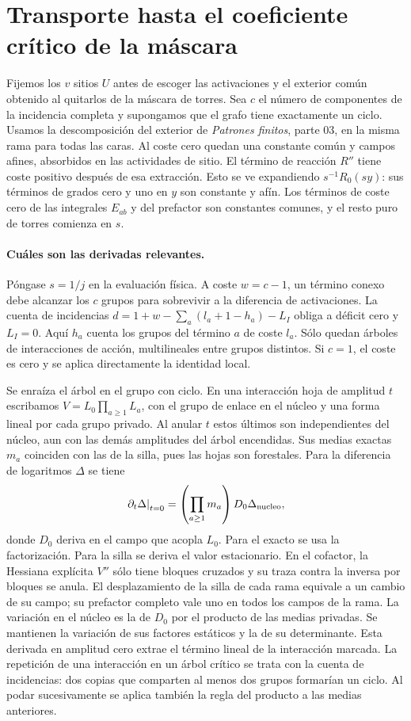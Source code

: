 \section{Transporte hasta el coeficiente crítico de la máscara}
Fijemos los $v$ sitios $U$ antes de escoger las activaciones y el exterior común
obtenido al quitarlos de la máscara de torres. Sea $c$ el número de componentes
de la incidencia completa y supongamos que el grafo tiene exactamente un ciclo.
Usamos la descomposición del exterior de \emph{Patrones finitos}, parte 03, en la
misma rama para todas las caras. Al coste cero quedan una constante común y campos
afines, absorbidos en las actividades de sitio. El término de reacción $R''$
tiene coste positivo después de esa extracción. Esto se ve expandiendo
$s^{-1}R_0(sy)$: sus términos de grados cero y uno en $y$ son constante y afín.
Los términos de coste cero de las integrales $E_{ab}$ y del prefactor
son constantes comunes, y el resto puro de torres comienza en $s$.

\paragraph{Cuáles son las derivadas relevantes.}
Póngase $s=1/j$ en la evaluación física. A coste $w=c-1$, un término conexo
debe alcanzar los $c$ grupos para sobrevivir a la diferencia de activaciones.
La cuenta de incidencias $d=1+w-\sum_a(l_a+1-h_a)-L_I$ obliga a déficit cero
y $L_I=0$. Aquí $h_a$ cuenta los grupos del término $a$ de coste $l_a$.
Sólo quedan árboles de interacciones de acción, multilineales entre grupos distintos.
Si $c=1$, el coste es cero y se aplica directamente la identidad local.

Se enraíza el árbol en el grupo con ciclo. En una interacción hoja de amplitud $t$
escribamos $V=L_0\prod_{a\ge1}L_a$, con el grupo de enlace en el núcleo y una
forma lineal por cada grupo privado. Al anular $t$ estos últimos son independientes
del núcleo, aun con las demás amplitudes del árbol encendidas. Sus medias exactas
$m_a$ coinciden con las de la silla, pues las hojas son forestales.
Para la diferencia de logaritmos $\Delta$ se tiene
\[
 \left.\partial_t\Delta\right|_{t=0}
    =\left(\prod_{a\ge1}m_a\right)D_0\Delta_{\rm nucleo},
\]
donde $D_0$ deriva en el campo que acopla $L_0$. Para el exacto se usa la
factorización. Para la silla se deriva el valor estacionario. En el cofactor,
la Hessiana explícita $V''$ sólo tiene bloques cruzados y su traza contra la inversa
por bloques se anula. El desplazamiento de la silla de cada rama equivale a un
cambio de su campo; su prefactor completo vale uno en todos los campos de la rama.
La variación en el núcleo es la de $D_0$ por el producto de las medias privadas.
Se mantienen la variación de sus factores estáticos y la de su determinante.
Esta derivada en amplitud cero extrae el término lineal de la interacción marcada.
La repetición de una interacción en un árbol crítico se trata con la cuenta de
incidencias: dos copias que comparten al menos dos grupos formarían un ciclo.
Al podar sucesivamente se aplica también la regla del producto a las medias anteriores.


